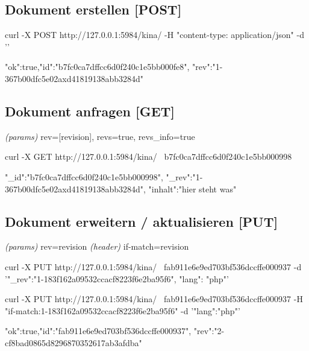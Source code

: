 \documentclass[19pt,landscape,twocolumn]{article}
\newcommand{\htmlverb}[1]{{[}\textbf{{#1}}{]}}
\newcommand{\setparskip}{\setlength{\parskip}{-6mm}}
\newcommand{\resetparskip}{\setlength{\parskip}{1mm}}
\begin{document}
\subsection{Dokument erstellen \htmlverb{POST}}

\begin{code}
curl -X POST http://127.0.0.1:5984/kina/
     -H "content-type: application/json"
     -d '{}'
\end{code}
\setparskip
\begin{response}
{"ok":true,"id":"b7fc0ca7dffcc6d0f240c1e5bb000fe8",
 "rev":"1-367b00dfc5e02axd41819138abb3284d"}
\end{response}
\resetparskip

\subsection{Dokument anfragen \htmlverb{GET}}
\emph{(params)} rev={[}revision{]}, revs=true, revs\_info=true

\begin{code}
curl -X GET http://127.0.0.1:5984/kina/ \
  b7fc0ca7dffcc6d0f240c1e5bb000998
\end{code}
\setparskip
\begin{response}
{"_id":"b7fc0ca7dffcc6d0f240c1e5bb000998",
 "_rev":"1-367b00dfc5e02axd41819138abb3284d",
 "inhalt":"hier steht was"}
\end{response}
\resetparskip

\subsection{Dokument erweitern / aktualisieren \htmlverb{PUT}}
\emph{(params)} rev=revision \newline
\emph{(header)} if-match=revision

\begin{code}
curl -X PUT http://127.0.0.1:5984/kina/ \
  fab911e6e9ed703bf536dccffe000937
     -d '{"_rev":"1-183f162a09532ccacf8223f6e2ba95f6",
          "lang": "php"}'
\end{code}

\begin{code}
curl -X PUT http://127.0.0.1:5984/kina/ \
  fab911e6e9ed703bf536dccffe000937 
  -H "if-match:1-183f162a09532ccacf8223f6e2ba95f6" 
  -d '{"lang":"php"}'
\end{code}
\setparskip
\begin{response}
{"ok":true,"id":"fab911e6e9ed703bf536dccffe000937",
 "rev":"2-cf8bad0865d8296870352617ab3afdba"}
\end{response}
\resetparskip
\end{document}
